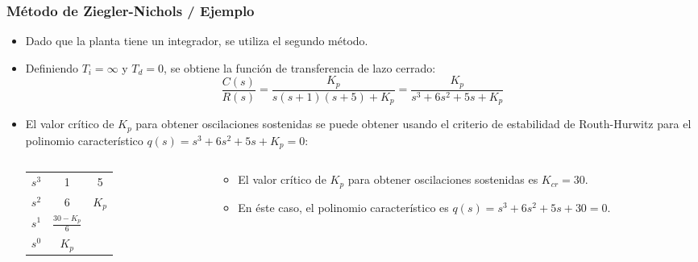\documentclass[aspectratio=169]{beamer}
\theoremstyle{definition}
\theoremstyle{plain}
\theoremstyle{remark}
\begin{document}
\begin{frame}[<+->]\frametitle{Método de Ziegler-Nichols / Ejemplo}
\begin{itemize}
	\item Dado que la planta tiene un integrador, se utiliza el segundo método.
	\item Definiendo $T_i = \infty$ y $T_d = 0$, se obtiene la función de transferencia de lazo cerrado:
	\begin{equation*}
		\frac{C(s)}{R(s)} = \frac{K_p}{s(s+1)(s+5) + K_p} = \frac{K_p}{s^3 + 6s^2 + 5s + K_p}
	\end{equation*}
	\item El valor crítico de $K_p$ para obtener oscilaciones sostenidas se puede obtener usando el criterio de estabilidad de Routh-Hurwitz para el polinomio característico $q(s) = s^3 + 6s^2 + 5s + K_p = 0$:
	\begin{columns}
	\begin{column}{0.4\textwidth}
		\begin{table}
		\begin{tabular}{c|cc}
			$s^3$ & 1 & 5\\
			$s^2$ & 6 & $K_p$\\
			$s^1$ & $\frac{30-K_p}{6}$ & \\
			$s^0$ & $K_p$ & 
		\end{tabular}
		\end{table}
	\end{column}	
	\begin{column}{0.6\textwidth}
		\begin{itemize}
			\item El valor crítico de $K_p$ para obtener oscilaciones sostenidas es $K_{cr} = 30$.
			\item En éste caso, el polinomio característico es $q(s) = s^3 + 6s^2 + 5s + 30 = 0$.
		\end{itemize}
	\end{column}	
	\end{columns}
\end{itemize}
\end{frame}
\end{document}
